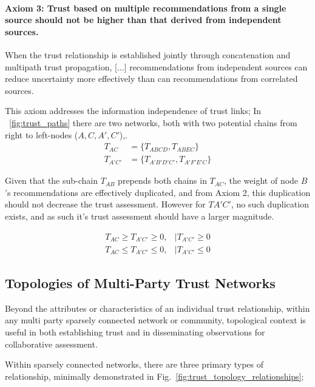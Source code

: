 \paragraph{Axiom 3: Trust based on multiple recommendations from a single source should not be higher than that derived from independent sources.}

\begin{displayquote}
	When the trust relationship is established jointly through concatenation and multipath trust propagation, [...] recommendations from independent sources can reduce uncertainty more effectively than can recommendations from correlated sources.
\end{displayquote}

This axiom addresses the information independence of trust links; In ~\autoref{fig:trust_paths} there are two networks, both with two potential chains from right to left-nodes ($A,C,A',C'$),.
\begin{align}
T_{AC}&=\{T_{ABCD}, T_{ABEC}\}\\
T_{A'C'}&=\{T_{A'B'D'C'}, T_{A'F'E'C}\}
\end{align}

Given that the sub-chain $T_{AB}$ prepends both chains in $T_{AC}$, the weight of node $B$'s recommendations are effectively duplicated, and from Axiom 2, this duplication should not decrease the trust assessment.
However for $T{A'C'}$, no such duplication exists, and as such it's trust assessment should have a larger magnitude.

\begin{align}
T_{AC} \geq T_{A'C'} \geq 0, &| T_{A'C'} \geq 0\\
T_{AC} \leq T_{A'C'} \leq 0, &| T_{A'C'} \le 0
\end{align}


\subsection{Topologies of Multi-Party Trust Networks}\label{sec:trust_topologies}
Beyond the attributes or characteristics of an individual trust relationship, within any multi party sparsely connected network or community, topological context is useful in both establishing trust and in disseminating observations for collaborative assessment.

Within sparsely connected networks, there are three primary types of relationship, minimally demonstrated in Fig.~\ref{fig:trust_topology_relationships};

